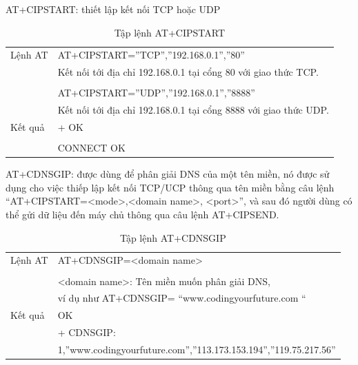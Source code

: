 AT+CIPSTART: thiết lập kết nối TCP hoặc UDP
\begin{table}[H]
\label{table:AT+CIPSTART}
\begin{tabular}{|l|l|}
\hline
Lệnh AT & AT+CIPSTART=”TCP”,”192.168.0.1”,”80” \\ 
& Kết nối tới địa chỉ 192.168.0.1 tại cổng 80 với giao thức TCP.\\
& \\
& AT+CIPSTART=”UDP”,”192.168.0.1”,”8888” \\ 
& Kết nối tới địa chỉ 192.168.0.1 tại cổng 8888 với giao thức UDP.\\ \hline
Kết quả  &+ OK \\
& \\
& CONNECT OK\\\hline
\end{tabular}

\caption[Tập lệnh AT+CIPSTART: thiết lập kết nối TCP hoặc UDP]{Tập lệnh AT+CIPSTART}
\end{table}


AT+CDNSGIP: được dùng để phân giải DNS của một tên miền, nó được sử dụng cho việc thiếp lập kết nối TCP/UCP thông qua tên miền bằng câu lệnh “AT+CIPSTART=<mode>,<domain name>, <port>”, và sau đó người dùng có thể gửi dữ liệu đến máy chủ thông qua câu lệnh AT+CIPSEND.
\begin{table}[H]
\label{table:AT+CDNSGIP}
\begin{tabular}{|l|l|}
\hline
Lệnh AT & AT+CDNSGIP=<domain name> \\ 
& \\
& <domain name>: Tên miền muốn phân giải DNS, \\

& ví dụ như AT+CDNSGIP= “www.codingyourfuture.com “\\ \hline
Kết quả  &OK \\
&+ CDNSGIP:\\
&1,”www.codingyourfuture.com”,”113.173.153.194”,”119.75.217.56”\\\hline
\end{tabular}

\caption[Tập lệnh AT+CDNSGIP: phân giải DNS tên miền]{Tập lệnh AT+CDNSGIP}
\end{table}













